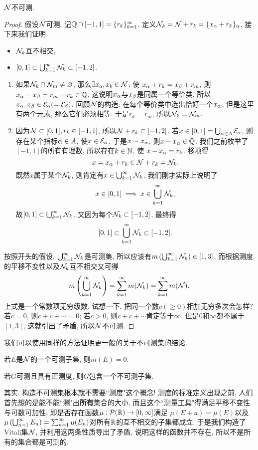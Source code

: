 \begin{theorem}
    $\mathcal{N}$不可测.
\end{theorem}
\begin{proof}
    假设$\mathcal{N}$可测, 记$\mathbb{Q} \cap [-1,1]=\{r_k\}_{k=1}^\infty$.
    定义$\mathcal{N}_k = \mathcal{N} + r_k = \{x_\alpha + r_k\}_\alpha$, 接下来我们证明
    \begin{itemize}
    \item $\mathcal{N}_k$互不相交, 
    \item $[0,1] \subset \bigcup_{k=1}^{\infty}\mathcal{N}_k \subset [-1,2]$. 
    \end{itemize}
    \begin{enumerate}
    \item 如果$\mathcal{N}_k \cap \mathcal{N}_m \neq \varnothing$, 
    那么$\exists x_a, x_b \in \mathcal{N}$, 使
    $x_\alpha + r_k = x_\beta + r_m,$
    则$x_\alpha-x_\beta = r_m - r_k \in \mathbb{Q}$, 这说明$x_\alpha$与$x_\beta$是同属一个等价类, 所以$x_\alpha, x_\beta \in \mathcal{E}_\alpha (=\mathcal{E}_\beta)$. 
    回顾$\mathcal{N}$的构造: 在每个等价类中选出恰好一个$x_\alpha$, 但是这里有两个元素, 那么它们必须相等. 于是$r_k=r_m$, 所以$\mathcal{N}_k = \mathcal{N}_m$. 
    \item 因为$\mathcal{N} \subset [0,1], r_k \in [-1,1]$, 所以$\mathcal{N}+r_k \subset [-1,2]$. 
    若$x \in [0,1] = \bigcup_{\alpha \in A}\mathcal{E}_\alpha$, 则存在某个指标$\alpha \in A$, 使$x \in \mathcal{E}_\alpha$, 于是$x \sim x_\alpha$, 则$x-x_\alpha \in \mathbb{Q}$. 我们之前枚举了$[-1,1]$的所有有理数, 所以存在$k \in \mathbb{N}$, 使
    $x-x_\alpha = r_k$. 移项得
    $$x = x_\alpha + r_k \in \mathcal{N} + r_k = \mathcal{N}_k.$$ 
    既然$x$属于某个$\mathcal{N}_k$, 则肯定有$x \in \bigcup_{k=1}^{\infty}\mathcal{N}_k$. 我们刚才实际上说明了
    $$x \in [0,1] \implies x \in \bigcup_{k=1}^{\infty}\mathcal{N}_k,$$
    故$[0,1] \subset \bigcup_{k=1}^{\infty}\mathcal{N}_k$.
    又因为每个$\mathcal{N}_k \subset [-1,2]$, 最终得
    $$[0,1] \subset \bigcup_{k=1}^{\infty}\mathcal{N}_k \subset [-1,2].$$
    \end{enumerate}
    按照开头的假设, $\bigcup_{k=1}^{\infty}\mathcal{N}_k$是可测集, 所以应该有$m\left(\bigcup_{k=1}^{\infty}\mathcal{N}_k\right) \in [1,3]$, 而根据测度的平移不变性以及$\mathcal{N}_k$互不相交又可得
    $$m\left(\bigcup_{k=1}^{\infty}\mathcal{N}_k\right)
    = \sum_{k=1}^{\infty}m(\mathcal{N}_k) = \sum_{k=1}^{\infty}m(\mathcal{N}).$$
    上式是一个常数项无穷级数. 试想一下, 把同一个数$c(\geq 0)$相加无穷多次会怎样? 若$c=0$, 则$c+c+\cdots = 0$; 若$c>0$, 则$c+c+\cdots$肯定等于$\infty$. 但是$0$和$\infty$都不属于$[1,3]$, 这就引出了矛盾, 所以$\mathcal{N}$不可测. 
\end{proof}

我们可以使用同样的方法证明更一般的关于不可测集的结论.
\begin{exercise} %
    若$E$是$\mathcal{N}$的一个可测子集, 则$m(E) = 0$. 
\end{exercise}
\begin{exercise} %
    若$G$可测且具有正测度, 则$G$包含一个不可测子集.
\end{exercise}

其实, 构造不可测集根本就不需要``测度"这个概念! 测度的标准定义出现之前, 人们首先想的是能不能``测"出\textbf{所有}集合的大小, 而且这个``测量工具"得满足平移不变性与可数可加性, 即是否存在函数$\mu: \mathcal{P}(\mathbb{R}) \to [0,\infty]$满足
$\mu(E+a) = \mu(E)$以及$\mu\left(\bigcup_{n=1}^{\infty}E_n\right) = \sum_{n=1}^{\infty}\mu(E_n)$对所有$\mathbb{R}$的互不相交的子集都成立. 于是我们构造了Vitali集$\mathcal{N}$, 并利用这两条性质导出了矛盾, 说明这样的函数并不存在, 所以不是所有的集合都是可测的. 